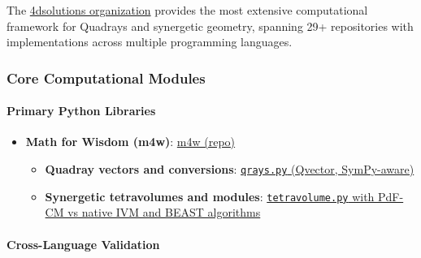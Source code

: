 \documentclass[
  10pt,
]{article}
\newcommand{\passthrough}[1]{#1}
\providecommand{\tightlist}{%
  \setlength{\itemsep}{0pt}\setlength{\parskip}{0pt}}
\begin{document}
The \href{https://github.com/4dsolutions}{4dsolutions organization}
provides the most extensive computational framework for Quadrays and
synergetic geometry, spanning 29+ repositories with implementations
across multiple programming languages.

\hypertarget{core-computational-modules}{%
\subsubsection{Core Computational
Modules}\label{core-computational-modules}}

\hypertarget{primary-python-libraries}{%
\paragraph{Primary Python Libraries}\label{primary-python-libraries}}

\begin{itemize}
\tightlist
\item
  \textbf{Math for Wisdom (m4w)}:
  \href{https://github.com/4dsolutions/m4w}{m4w (repo)}

  \begin{itemize}
  \tightlist
  \item
    \textbf{Quadray vectors and conversions}:
    \href{https://github.com/4dsolutions/m4w/blob/main/qrays.py}{\passthrough{\lstinline!qrays.py!}
    (Qvector, SymPy-aware)}
  \item
    \textbf{Synergetic tetravolumes and modules}:
    \href{https://github.com/4dsolutions/m4w/blob/main/tetravolume.py}{\passthrough{\lstinline!tetravolume.py!}
    with PdF-CM vs native IVM and BEAST algorithms}
  \end{itemize}
\end{itemize}

\hypertarget{cross-language-validation}{%
\paragraph{Cross-Language Validation}\label{cross-language-validation}}
\end{document}
